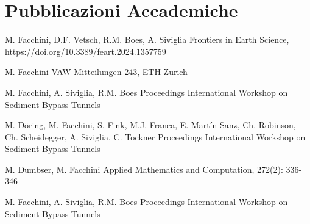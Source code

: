 
\section{Pubblicazioni Accademiche}

M. Facchini, D.F. Vetsch, R.M. Boes, A. Siviglia
Frontiers in Earth Science, \url{https://doi.org/10.3389/feart.2024.1357759}
\sectionsep

M. Facchini
VAW Mitteilungen 243, ETH Zurich
\sectionsep

M. Facchini, A. Siviglia, R.M. Boes
Proceedings International Workshop on Sediment Bypass Tunnels
\sectionsep

M. Döring, M. Facchini, S. Fink, M.J. Franca, E. Martín Sanz, Ch. Robinson, Ch. Scheidegger, A. Siviglia, C. Tockner
Proceedings International Workshop on Sediment Bypass Tunnels
\sectionsep

M. Dumbser, M. Facchini
Applied Mathematics and Computation, 272(2): 336-346
\sectionsep

M. Facchini, A. Siviglia, R.M. Boes
Proceedings International Workshop on Sediment Bypass Tunnels
\sectionsep
